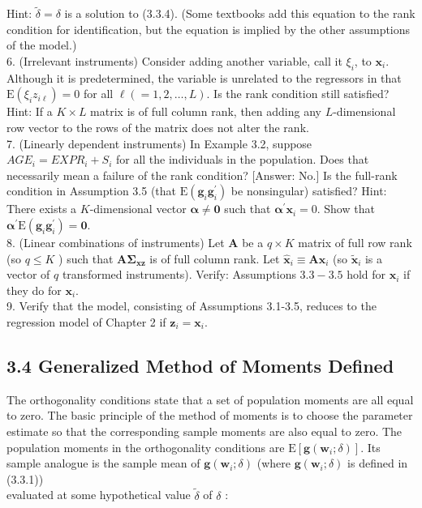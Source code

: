 \documentclass[10pt]{article}
\begin{document}
Hint: $\tilde{\delta}=\delta$ is a solution to (3.3.4). (Some textbooks add this equation to the rank condition for identification, but the equation is implied by the other assumptions of the model.)\\
6. (Irrelevant instruments) Consider adding another variable, call it $\xi_{i}$, to $\mathbf{x}_{i}$. Although it is predetermined, the variable is unrelated to the regressors in that $\mathrm{E}\left(\xi_{i} z_{i \ell}\right)=0$ for all $\ell(=1,2, \ldots, L)$. Is the rank condition still satisfied? Hint: If a $K \times L$ matrix is of full column rank, then adding any $L$-dimensional row vector to the rows of the matrix does not alter the rank.\\
7. (Linearly dependent instruments) In Example 3.2, suppose $A G E_{i}=E X P R_{i}+ S_{i}$ for all the individuals in the population. Does that necessarily mean a failure of the rank condition? [Answer: No.] Is the full-rank condition in Assumption 3.5 (that $\mathrm{E}\left(\mathbf{g}_{i} \mathbf{g}_{i}^{\prime}\right)$ be nonsingular) satisfied? Hint: There exists a $K$-dimensional vector $\boldsymbol{\alpha} \neq \mathbf{0}$ such that $\boldsymbol{\alpha}^{\prime} \mathbf{x}_{i}=0$. Show that $\boldsymbol{\alpha}^{\prime} \mathrm{E}\left(\mathbf{g}_{i} \mathbf{g}_{i}^{\prime}\right)=\mathbf{0}$.\\
8. (Linear combinations of instruments) Let $\mathbf{A}$ be a $q \times K$ matrix of full row rank (so $q \leq K$ ) such that $\mathbf{A} \boldsymbol{\Sigma}_{\mathbf{x z}}$ is of full column rank. Let $\hat{\mathbf{x}}_{i} \equiv \mathbf{A} \mathbf{x}_{i}$ (so $\tilde{\mathbf{x}}_{i}$ is a vector of $q$ transformed instruments). Verify: Assumptions $3.3-3.5$ hold for $\hat{\mathbf{x}}_{i}$ if they do for $\mathbf{x}_{i}$.\\
9. Verify that the model, consisting of Assumptions 3.1-3.5, reduces to the regression model of Chapter 2 if $\mathbf{z}_{i}=\mathbf{x}_{i}$.

\subsection*{3.4 Generalized Method of Moments Defined}
The orthogonality conditions state that a set of population moments are all equal to zero. The basic principle of the method of moments is to choose the parameter estimate so that the corresponding sample moments are also equal to zero. The population moments in the orthogonality conditions are $\mathrm{E}\left[\mathbf{g}\left(\mathbf{w}_{i} ; \delta\right)\right]$. Its sample analogue is the sample mean of $\mathbf{g}\left(\mathbf{w}_{i} ; \delta\right)$ (where $\mathbf{g}\left(\mathbf{w}_{i} ; \delta\right)$ is defined in (3.3.1))\\
evaluated at some hypothetical value $\tilde{\delta}$ of $\delta$ :
\end{document}
